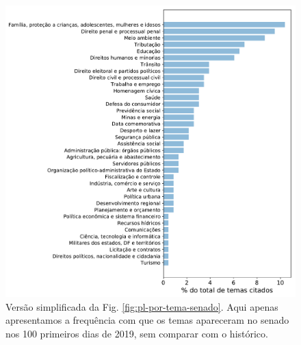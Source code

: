 \documentclass[12pt,a4paper]{article}
\begin{document}
\begin{figure}[H]
\centering
\includegraphics[width=1.0\textwidth]{graficos/senado/pls-temas-senado-r-simples.pdf}
\caption{Versão simplificada da Fig. \ref{fig:pl-por-tema-senado}. Aqui apenas apresentamos a frequência com
  que os temas apareceram no senado nos 100 primeiros dias de 2019, sem comparar com o histórico.}
\label{fig:pl-por-tema-senado-simples}
\end{figure}
\end{document}
